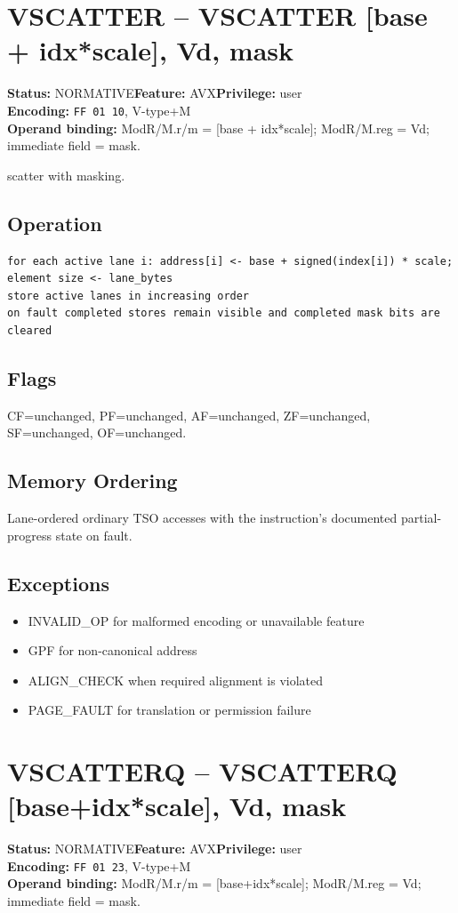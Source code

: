 \documentclass[10pt]{article}
\begin{document}
\section{VSCATTER -- VSCATTER [base + idx*scale], Vd, mask}
\textbf{Status:} NORMATIVE\quad \textbf{Feature:} AVX\quad \textbf{Privilege:} user\\
\textbf{Encoding:} \texttt{FF 01 10}, V-type+M\\
\textbf{Operand binding:} ModR/M.r/m = [base + idx*scale]; ModR/M.reg = Vd; immediate field = mask.

scatter with masking.

\subsection*{Operation}
\begin{lstlisting}
for each active lane i: address[i] <- base + signed(index[i]) * scale; element size <- lane_bytes
store active lanes in increasing order
on fault completed stores remain visible and completed mask bits are cleared
\end{lstlisting}
\subsection*{Flags}
CF=unchanged, PF=unchanged, AF=unchanged, ZF=unchanged, SF=unchanged, OF=unchanged.
\subsection*{Memory Ordering}
Lane-ordered ordinary TSO accesses with the instruction's documented partial-progress state on fault.
\subsection*{Exceptions}
\begin{itemize}
\item INVALID\_OP for malformed encoding or unavailable feature
\item GPF for non-canonical address
\item ALIGN\_CHECK when required alignment is violated
\item PAGE\_FAULT for translation or permission failure
\end{itemize}
\clearpage

\section{VSCATTERQ -- VSCATTERQ [base+idx*scale], Vd, mask}
\textbf{Status:} NORMATIVE\quad \textbf{Feature:} AVX\quad \textbf{Privilege:} user\\
\textbf{Encoding:} \texttt{FF 01 23}, V-type+M\\
\textbf{Operand binding:} ModR/M.r/m = [base+idx*scale]; ModR/M.reg = Vd; immediate field = mask.
\end{document}
